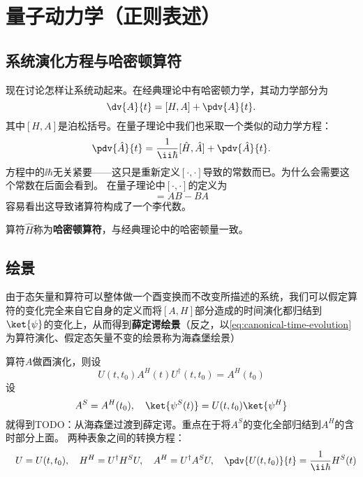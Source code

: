 
\section{量子动力学（正则表述）}

\subsection{系统演化方程与哈密顿算符}

现在讨论怎样让系统动起来。在经典理论中有哈密顿力学，其动力学部分为
\begin{equation}
    \dv{A}{t} = [H, A] + \pdv{A}{t}.
\end{equation}
其中$[H, A]$是泊松括号。在量子理论中我们也采取一个类似的动力学方程：
\begin{equation}
    \pdv{\hat{A}}{t} = \frac{1}{\ii \hbar} [\hat{H}, \hat{A}] + \pdv{\hat{A}}{t}.
\end{equation}
方程中的$\ii \hbar$无关紧要——这只是重新定义$[\cdot, \cdot]$导致的常数而已。为什么会需要这个常数在后面会看到。
在量子理论中$[\cdot, \cdot]$的定义为
\begin{equation}
    [A, B] = AB - BA
\end{equation}
容易看出这导致诸算符构成了一个李代数。

算符$\hat{H}$称为\textbf{哈密顿算符}，与经典理论中的哈密顿量一致。

\subsection{绘景}

由于态矢量和算符可以整体做一个酉变换而不改变所描述的系统，我们可以假定算符的变化完全来自它自身的定义而将$[A, H]$部分造成的时间演化都归结到$\ket{\psi}$的变化上，从而得到\textbf{薛定谔绘景}（反之，以\eqref{eq:canonical-time-evolution}为算符演化、假定态矢量不变的绘景称为海森堡绘景）

算符$A$做酉演化，则设
\begin{equation}
    U(t, t_0) A^H(t) U^\dagger(t, t_0) = A^H(t_0)
\end{equation}
设
\begin{equation}
    A^S = A^H(t_0), \quad \ket{\psi^S(t)} = U(t, t_0) \ket{\psi^H}
\end{equation}
就得到TODO：从海森堡过渡到薛定谔。重点在于将$A^S$的变化全部归结到$A^H$的含时部分上面。
两种表象之间的转换方程：
\begin{equation}
    \quad U = U(t, t_0), \quad H^H = U^\dagger H^S U, \quad A^H = U^\dagger A^S U, \quad \pdv{U(t, t_0)}{t} = \frac{1}{\ii \hbar} H^S(t)
\end{equation}

